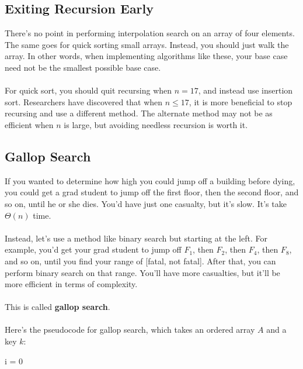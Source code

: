 \documentclass[]{article}
\theoremstyle{definition}
\begin{document}
		\subsection{Exiting Recursion Early}
			There's no point in performing interpolation search on an array of four elements. The same goes for quick sorting small arrays. Instead, you should just walk the array. In other words, when implementing algorithms like these, your base case need not be the smallest possible base case.
			\\ \\
			For quick sort, you should quit recursing when $n = 17$, and instead use insertion sort. Researchers have discovered that when $n \le 17$, it is more beneficial to stop recursing and use a different method. The alternate method may not be as efficient when $n$ is large, but avoiding needless recursion is worth it.

		\subsection{Gallop Search}
			If you wanted to determine how high you could jump off a building before dying, you could get a grad student to jump off the first floor, then the second floor, and so on, until he or she dies. You'd have just one casualty, but it's slow. It's take $\Theta(n)$ time.
			\\ \\
			Instead, let's use a method like binary search but starting at the left. For example, you'd get your grad student to jump off $F_1$, then $F_2$, then $F_4$, then $F_8$, and so on, until you find your range of [fatal, not fatal]. After that, you can perform binary search on that range. You'll have more casualties, but it'll be more efficient in terms of complexity.
			\\ \\
			This is called \textbf{gallop search}.
			\\ \\
			Here's the pseudocode for gallop search, which takes an ordered array $A$ and a key $k$: \\
			\begin{algorithm}[H]
				i = 0\;
			\end{algorithm}
\end{document}
